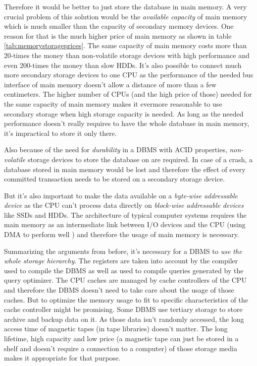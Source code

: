 	Therefore it would be better to just store the database in main memory. A very crucial problem of this solution would be the \emph{available capacity} of main memory which is much smaller than the capacity of secondary memory devices. One reason for that is the much higher price of main memory as shown in table \ref{tab:memorystorageprices}. The same capacity of main memory costs more than 20-times the money than non-volatile storage devices with high performance and even 200-times the money than slow HDDs. It's also possible to connect much more secondary storage devices to one CPU as the performance of the needed bus interface of main memory doesn't allow a distance of more than a few centimeters. The higher number of CPUs (and the high price of those) needed for the same capacity of main memory makes it evermore reasonable to use secondary storage when high storage capacity is needed. As long as the needed performance doesn't really requires to have the whole database in main memory, it's impractical to store it only there.
	
	Also because of the need for \emph{durability} in a DBMS with ACID properties, \emph{non-volatile} storage devices to store the database on are required. In case of a crash, a database stored in main memory would be lost and therefore the effect of every committed transaction needs to be stored on a secondary storage device.
		
	But it's also important to make the data available on a \emph{byte-wise addressable device} as the CPU can't process data directly on \emph{block-wise addressable devices} like SSDs and HDDs. The architecture of typical computer systems requires the main memory as an intermediate link between I/O devices and the CPU (using DMA to perform well \cite{Stallings:2013}) and therefore the usage of main memory is necessary.
		
	Summarizing the arguments from before, it's necessary for a DBMS to \emph{use the whole storage hierarchy}. The registers are taken into account by the compiler used to compile the DBMS as well as used to compile queries generated by the query optimizer. The CPU caches are managed by cache controllers of the CPU and therefore the DBMS doesn't need to take care about the usage of those caches. But to optimize the memory usage to fit to specific characteristics of the cache controller might be promising. Some DBMS use tertiary storage to store archive and backup data on it. As those data isn't randomly accessed, the long access time of magnetic tapes (in tape libraries) doesn't matter. The long lifetime, high capacity and low price (a magnetic tape can just be stored in a shelf and doesn't require a connection to a computer) of those storage media makes it appropriate for that purpose.


